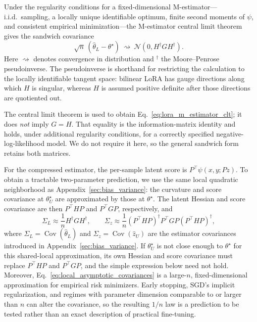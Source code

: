 Under the regularity conditions for a fixed-dimensional M-estimator---i.i.d.\ sampling, a locally unique identifiable optimum, finite second moments of $\psi$, and consistent empirical minimization---the M-estimator central limit theorem gives the sandwich covariance \citep{vanderVaart1998asymptotic,white1982maximum}
\begin{equation}
\sqrt n\,(\hat\theta_L-\theta^\star)
\ \rightsquigarrow\
\mathcal N\!\left(0,H^\dagger G H^\dagger\right).
\label{eq:lora_m_estimator_clt}
\end{equation}
Here $\rightsquigarrow$ denotes convergence in distribution and ${}^\dagger$ the Moore--Penrose pseudoinverse.
The pseudoinverse is shorthand for restricting the calculation to the locally identifiable tangent space: bilinear LoRA has gauge directions along which $H$ is singular, whereas $H$ is assumed positive definite after those directions are quotiented out.

The central limit theorem is used to obtain Eq.~\eqref{eq:lora_m_estimator_clt}; it does \emph{not} imply $G=H$.
That equality is the information-matrix identity and holds, under additional regularity conditions, for a correctly specified negative-log-likelihood model.
We do not require it here, so the general sandwich form retains both matrices.

For the compressed estimator, the per-sample latent score is $P^\top\psi(x,y;Pz)$.
To obtain a tractable two-parameter prediction, we use the same local quadratic neighborhood as Appendix~\ref{sec:bias_variance}: the curvature and score covariance at $\theta^\star_U$ are approximated by those at $\theta^\star$.
The latent Hessian and score covariance are then $P^\top HP$ and $P^\top GP$, respectively, and
\begin{equation}
\Sigma_L
\approx
\frac{1}{n}H^\dagger G H^\dagger,
\qquad
\Sigma_z
\approx
\frac{1}{n}
(P^\top HP)^\dagger
P^\top GP
(P^\top HP)^\dagger,
\label{eq:local_asymptotic_covariances}
\end{equation}
where $\Sigma_L=\operatorname{Cov}(\hat\theta_L)$ and $\Sigma_z=\operatorname{Cov}(\hat z_U)$ are the estimator covariances introduced in Appendix~\ref{sec:bias_variance}.
If $\theta^\star_U$ is not close enough to $\theta^\star$ for this shared-local approximation, its own Hessian and score covariance must replace $P^\top HP$ and $P^\top GP$, and the simple expression below need not hold.
Moreover, Eq.~\eqref{eq:local_asymptotic_covariances} is a large-$n$, fixed-dimensional approximation for empirical risk minimizers.
Early stopping, SGD's implicit regularization, and regimes with parameter dimension comparable to or larger than $n$ can alter the covariance, so the resulting $1/n$ law is a prediction to be tested rather than an exact description of practical fine-tuning.

